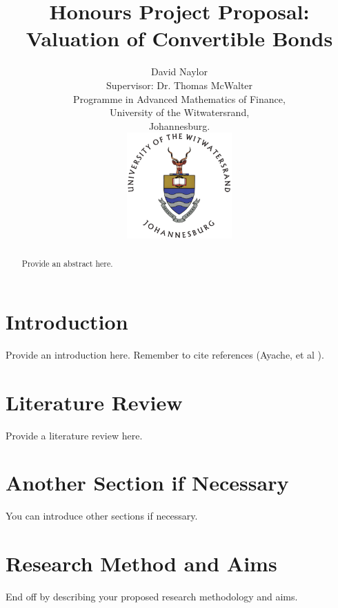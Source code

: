 \documentclass[a4paper,11pt,oneside]{article}
\title{Honours Project Proposal:\\
Valuation of Convertible Bonds}
\author{David Naylor\\[1cm]
Supervisor: Dr. Thomas McWalter\\[3cm]
Programme in Advanced Mathematics of Finance,\\
University of the Witwatersrand,\\
Johannesburg.\\[2cm]
\includegraphics[width=4cm]{../common/WitsColourLogo}\\[2cm]
}
\newcommand{\setlinespacing}[1]
           {\renewcommand{\baselinestretch}{#1}\small\normalsize}
\begin{document}
\maketitle
\thispagestyle{empty}

\setlinespacing{1.20}
\newpage

\setcounter{page}{1}


\def\abstractname{\Large Abstract}
\begin{abstract}
Provide an abstract here.
\end{abstract}



\section{Introduction}

Provide an introduction here. Remember to cite references (Ayache, et al \cite{AFV03}).

\section{Literature Review}

Provide a literature review here.

\section{Another Section if Necessary}

You can introduce other sections if necessary.

\section{Research Method and Aims}

End off by describing your proposed research methodology and aims.


\clearpage
\setlinespacing{1}


\end{document}
